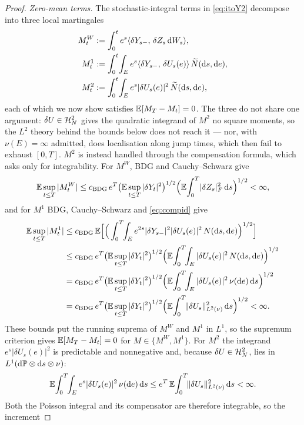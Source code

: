 \begin{proof}
\emph{Zero-mean terms.} The stochastic-integral terms in \eqref{eq:itoY2} decompose into three
local martingales
\[
\begin{aligned}
M^W_t&:=\int_0^t e^{s}\langle \delta Y_{s-},\,\delta Z_s\,\mathrm{d} W_s\rangle,\\
M^1_t&:=\int_0^t\!\int_E e^{s}\langle \delta Y_{s-},\,\delta U_s(e)\rangle\,\widetilde{N}(\mathrm{d} s,\mathrm{d} e),\\
M^2_t&:=\int_0^t\!\int_E e^{s}|\delta U_s(e)|^2\,\widetilde{N}(\mathrm{d} s,\mathrm{d} e),
\end{aligned}
\]
each of which we now show satisfies $\mathbb{E}[M_T-M_t]=0$. The three do not share one argument:
$\delta U\in\mathcal{H}^2_N$ gives the quadratic integrand of $M^2$ no square moments, so the $L^2$
theory behind the bounds below does not reach it --- nor, with $\nu(E)=\infty$ admitted,
does localisation along jump times, which then fail to exhaust $[0,T]$. $M^2$ is instead
handled through the compensation formula, which asks only for integrability.
For $M^W$, BDG and Cauchy--Schwarz give
\[
\mathbb{E}\sup_{t\le T}|M^W_t|
\le c_{\mathrm{BDG}}\,e^{T}\big(\mathbb{E}\sup_{t\le T}|\delta Y_t|^2\big)^{1/2}
\Big(\mathbb{E}\!\int_0^T\!|\delta Z_s|_F^2\,\mathrm{d} s\Big)^{1/2}<\infty ,
\]
and for $M^1$ BDG, Cauchy--Schwarz and \eqref{eq:compid} give
\begin{align*}
\E\sup_{t\le T}|M^1_t|
&\le c_{\mathrm{BDG}}\,\E\Big[\Big(\int_0^T\!\!\int_E e^{2s}|\delta Y_{s-}|^2|\delta U_s(e)|^2
\,N(\diff s,\diff e)\Big)^{1/2}\Big]\\
&\le c_{\mathrm{BDG}}\,e^{T}\big(\E\sup_{t\le T}|\delta Y_t|^2\big)^{1/2}
\Big(\E\!\int_0^T\!\!\int_E|\delta U_s(e)|^2\,N(\diff s,\diff e)\Big)^{1/2}\\
&=c_{\mathrm{BDG}}\,e^{T}\big(\E\sup_{t\le T}|\delta Y_t|^2\big)^{1/2}
\Big(\E\!\int_0^T\!\!\int_E|\delta U_s(e)|^2\,\nu(\diff e)\,\diff s\Big)^{1/2}\\
&=c_{\mathrm{BDG}}\,e^{T}\big(\E\sup_{t\le T}|\delta Y_t|^2\big)^{1/2}
\Big(\E\!\int_0^T\!\Lnorm{\delta U_s}^2\,\diff s\Big)^{1/2}<\infty .
\end{align*}
These bounds put the running suprema of $M^W$ and $M^1$ in $L^1$, so the supremum
criterion gives $\mathbb{E}[M_T-M_t]=0$ for $M\in\{M^W,M^1\}$.
For $M^2$ the integrand $e^{s}|\delta U_s(e)|^2$ is predictable and nonnegative and,
because $\delta U\in\mathcal{H}^2_N$, lies in $L^1(\mathrm{d}\mathbb{P}\otimes\mathrm{d} s\otimes\nu)$:
\[
\mathbb{E}\!\int_0^T\!\!\int_E e^{s}|\delta U_s(e)|^2\,\nu(\mathrm{d} e)\,\mathrm{d} s
\le e^{T}\,\mathbb{E}\!\int_0^T\!\lVert \delta U_s\rVert_{L^2(\nu)}^2\,\mathrm{d} s<\infty .
\]
Both the Poisson integral and its compensator are therefore integrable, so the increment

\end{proof}
